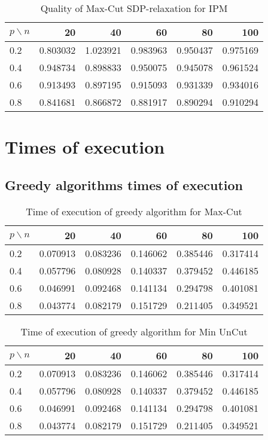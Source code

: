 \documentclass[12pt]{article}
\begin{document}
\begin{table}[H]
	\centering
	\begin{tabular}{|lrrrrr|}
		\toprule
		{$p \backslash n$} &       20  &       40  &       60  &       80  &       100 \\
		\midrule
		0.2 &  0.803032 &  1.023921 &  0.983963 &  0.950437 &  0.975169 \\
		0.4 &  0.948734 &  0.898833 &  0.950075 &  0.945078 &  0.961524 \\
		0.6 &  0.913493 &  0.897195 &  0.915093 &  0.931339 &  0.934016 \\
		0.8 &  0.841681 &  0.866872 &  0.881917 &  0.890294 &  0.910294 \\
		\bottomrule
	\end{tabular}
	\caption{Quality of Max-Cut SDP-relaxation for IPM}
\end{table}





\section{Times of execution}

\subsection{Greedy algorithms times of execution}

\begin{table}[H]
	\centering
	\begin{tabular}{|lrrrrr|}
		\toprule
		{$p \backslash n$} &       20  &       40  &       60  &       80  &       100 \\
		\midrule
		0.2 &  0.070913 &  0.083236 &  0.146062 &  0.385446 &  0.317414 \\
		0.4 &  0.057796 &  0.080928 &  0.140337 &  0.379452 &  0.446185 \\
		0.6 &  0.046991 &  0.092468 &  0.141134 &  0.294798 &  0.401081 \\
		0.8 &  0.043774 &  0.082179 &  0.151729 &  0.211405 &  0.349521 \\
		\bottomrule
	\end{tabular}
	\caption{Time of execution of greedy algorithm for Max-Cut}
\end{table}

\begin{table}[H]
	\centering
	\begin{tabular}{|lrrrrr|}
		\toprule
		{$p \backslash n$} &       20  &       40  &       60  &       80  &       100 \\
		\midrule
		0.2 &  0.070913 &  0.083236 &  0.146062 &  0.385446 &  0.317414 \\
		0.4 &  0.057796 &  0.080928 &  0.140337 &  0.379452 &  0.446185 \\
		0.6 &  0.046991 &  0.092468 &  0.141134 &  0.294798 &  0.401081 \\
		0.8 &  0.043774 &  0.082179 &  0.151729 &  0.211405 &  0.349521 \\
		\bottomrule
	\end{tabular}
	\caption{Time of execution of greedy algorithm for Min UnCut}
\end{table}
\end{document}

